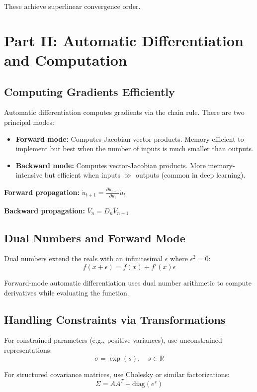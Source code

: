 \documentclass[12pt,a4paper]{article}
\theoremstyle{definition}
\begin{document}
These achieve superlinear convergence order.

\newpage

\section{Part II: Automatic Differentiation and Computation}

\subsection{Computing Gradients Efficiently}

Automatic differentiation computes gradients via the chain rule. There are two principal modes:

\begin{itemize}
  \item \textbf{Forward mode:} Computes Jacobian-vector products. Memory-efficient to implement but best when the number of inputs is much smaller than outputs.
  \item \textbf{Backward mode:} Computes vector-Jacobian products. More memory-intensive but efficient when inputs $\gg$ outputs (common in deep learning).
\end{itemize}

\textbf{Forward propagation:} $\dot{u}_{t+1} = \frac{\partial u_{t+1}}{\partial u_t} \dot{u}_t$

\textbf{Backward propagation:} $\bar{V}_n = D_n \bar{V}_{n+1}$

\subsection{Dual Numbers and Forward Mode}

Dual numbers extend the reals with an infinitesimal $\epsilon$ where $\epsilon^2 = 0$:
\[
f(x + \epsilon) = f(x) + f'(x) \epsilon
\]

Forward-mode automatic differentiation uses dual number arithmetic to compute derivatives while evaluating the function.

\subsection{Handling Constraints via Transformations}

For constrained parameters (e.g., positive variances), use unconstrained representations:
\[
\sigma = \exp(s), \quad s \in \mathbb{R}
\]

For structured covariance matrices, use Cholesky or similar factorizations:
\[
\Sigma = A A^T + \text{diag}(e^s)
\]
\end{document}
